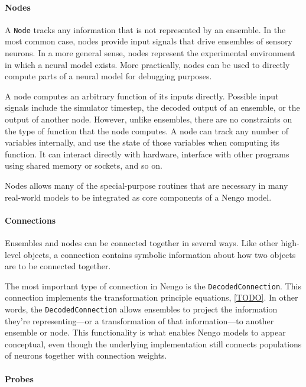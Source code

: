 \documentclass{frontiersSCNS}
\begin{document}
\paragraph{Nodes}
A \texttt{Node} tracks any information
that is not represented by an ensemble.
In the most common case,
nodes provide input signals
that drive ensembles of sensory neurons.
In a more general sense,
nodes represent the experimental environment
in which a neural model exists.
More practically,
nodes can be used to directly compute
parts of a neural model
for debugging purposes.

A node computes an arbitrary function
of its inputs directly.
Possible input signals include
the simulator timestep,
the decoded output of an ensemble,
or the output of another node.
However, unlike ensembles,
there are no constraints on the type
of function that the node computes.
A node can track any number of variables internally,
and use the state of those variables
when computing its function.
It can interact directly with hardware,
interface with other programs
using shared memory or sockets,
and so on.

Nodes allows many of the special-purpose
routines that are necessary in many real-world
models to be integrated
as core components of a Nengo model.

\paragraph{Connections}

Ensembles and nodes can be connected together
in several ways.
Like other high-level objects,
a connection contains symbolic information
about how two objects are to be connected
together.

The most important type of connection
in Nengo is the \texttt{DecodedConnection}.
This connection implements
the transformation principle equations,
\eqref{TODO}.
In other words, the \texttt{DecodedConnection}
allows ensembles to project
the information they're representing---or
a transformation of that information---to
another ensemble or node.
This functionality is what enables Nengo models
to appear conceptual,
even though the underlying implementation
still connects populations of neurons
together with connection weights.

\paragraph{Probes}
\end{document}
